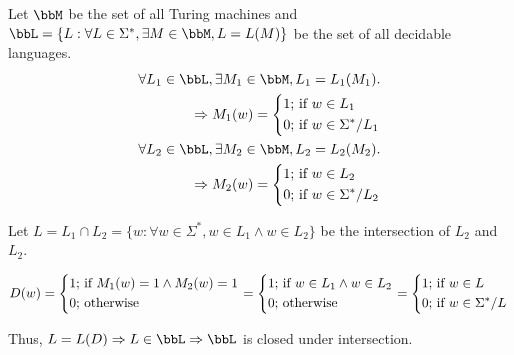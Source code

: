 \documentclass[twoside,11pt]{homework}
\begin{document}
\begin{solution}
  Let $\bbM$ be the set of all Turing machines and\\ $\bbL = \{ L : \forall L \in \Sigma^*, \exists M
  \in \bbM, L = L(M) \}$ be the set of all decidable languages.
  \[
    \begin{aligned}
      \forall L_1 \in \bbL, \exists M_1 \in \bbM, L_1 = L_1(M_1).\\
      \Rightarrow M_1(w) =
      \left\{
      \begin{aligned}
        1 ;& \text{ if } w \in L_1\\
        0 ;& \text{ if } w \in \Sigma^* / L_1
      \end{aligned}
      \right. \\
      \forall L_2 \in \bbL, \exists M_2 \in \bbM, L_2 = L_2(M_2).\\
      \Rightarrow M_2(w) =
      \left\{
      \begin{aligned}
        1 ;& \text{ if } w \in L_2\\
        0 ;& \text{ if } w \in \Sigma^* / L_2
      \end{aligned}
      \right. \\
    \end{aligned}
  \]

  Let $L = L_1 \cap L_2 = \{ w : \forall w \in \Sigma^*, w \in L_1 \land w \in L_2\}$ be the intersection of $L_2$ and $L_2$.
  \begin{construct}
    \[
      D(w) =
      \left\{
        \begin{aligned}
          1 ; & \text{ if } M_1(w) = 1 \land M_2(w) = 1\\
          0 ; & \text{ otherwise}
        \end{aligned}
      \right.
      =
      \left\{
        \begin{aligned}
          1 ; & \text{ if } w \in L_1 \land w \in L_2\\
          0 ; & \text{ otherwise}
        \end{aligned}
      \right.
      =
      \left\{
        \begin{aligned}
          1 ; & \text{ if } w \in L\\
          0 ; & \text{ if } w \in \Sigma^* / L
        \end{aligned}
      \right.\\
    \]
  \end{construct}

  Thus, $L = L(D) \Rightarrow L \in \bbL \Rightarrow \bbL$ is closed under intersection.

\end{solution}
\end{document}

